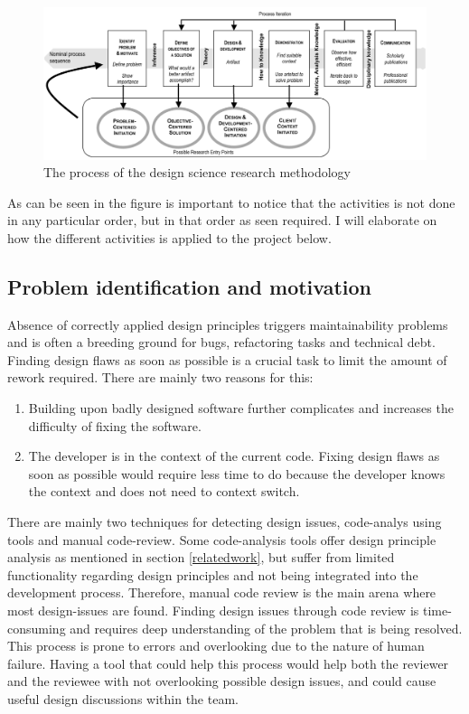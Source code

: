 \documentclass{article}
\begin{document}
\begin{figure}[h!]
    \centering
    \includegraphics[width=\textwidth]{report/images/designScience.png}
    \caption{The process of the design science research methodology}
    \label{fig:designScience}
\end{figure}



As can be seen in the figure is important to notice that the activities is not done in any particular order, but in that order as seen required. I will elaborate on how the different activities is applied to the project below. 



\subsection{Problem identification and motivation}
Absence of correctly applied design principles triggers maintainability problems and is often a breeding ground for bugs, refactoring tasks and technical debt. Finding design flaws as soon as possible is a crucial task to limit the amount of rework required. There are mainly two reasons for this: 

\begin{enumerate}
    \item Building upon badly designed software further complicates and increases the difficulty of fixing the software.

    \item The developer is in the context of the current code. Fixing design flaws as soon as possible would require less time to do because the developer knows the context and does not need to context switch.

\end{enumerate}

There are mainly two techniques for detecting design issues, code-analys using tools and manual code-review. Some code-analysis tools offer design principle analysis as mentioned in section \ref{relatedwork}, but suffer from limited functionality regarding design principles and not being integrated into the development process. Therefore, manual code review is the main arena where most design-issues are found. Finding design issues through code review is time-consuming and requires deep understanding of the problem that is being resolved. This process is prone to errors and overlooking due to the nature of human failure. Having a tool that could help this process would help both the reviewer and the reviewee with not overlooking possible design issues, and could cause useful design discussions within the team.
\end{document}
